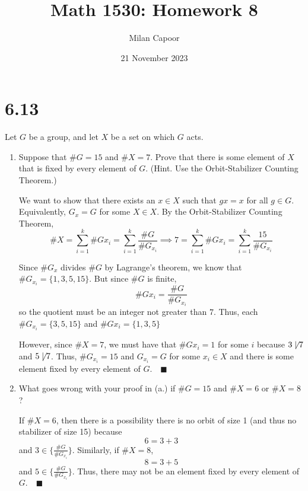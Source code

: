 \documentclass[12pt]{article}
\title{Math 1530: Homework 8}
\author{Milan Capoor}
\date{21 November 2023}
\newcommand{\qed}{\quad \blacksquare}
\begin{document}
\maketitle

\section*{6.13} 
Let $G$ be a group, and let $X$ be a set on which $G$ acts.
\begin{enumerate}
    \item Suppose that $\#G = 15$ and $\#X = 7.$ Prove that there is some element of $X$ that is fixed by every element of $G$. (Hint. Use the Orbit-Stabilizer Counting Theorem.)
    
        \color{blue}
            We want to show that there exists an $x \in X$ such that $gx = x$ for all $g \in G$. Equivalently, $G_x = G$ for some $X \in X$. By the Orbit-Stabilizer Counting Theorem, 
            \[\#X = \sum_{i=1}^k \#Gx_i = \sum_{i=1}^k \frac{\#G}{\# G_{x_i}} \implies 7 = \sum_{i=1}^k \#Gx_i = \sum_{i=1}^k \frac{15}{\#G_{x_i}}\]
            
            Since $\#G_x$ divides $\#G$ by Lagrange's theorem, we know that $\#G_{x_i} = \{1, 3, 5, 15\}$. But since $\#G$ is finite, 
            \[\#Gx_i = \frac{\#G}{\#G_{x_i}}\]
            so the quotient must be an integer not greater than $7$. Thus, each $\#G_{x_i} = \{3, 5, 15\}$ and $\#Gx_i = \{1, 3, 5\}$
            
            However, since $\#X = 7$, we must have that $\#Gx_i = 1$ for some $i$ because $3 \not \mid 7$ and $5 \not \mid 7$. Thus, $\#G_{x_i} = 15$ and $G_{x_i} = G$ for some $x_i \in X$ and there is some element fixed by every element of $G. \qed$
           
        \color{black}

    \item What goes wrong with your proof in (a.) if $\#G = 15$ and $\#X = 6$ or $\#X = 8$?

        \color{blue}
            If $\#X = 6$, then there is a possibility there is no orbit of size 1 (and thus no stabilizer of size 15) because 
            \[6 = 3+3\] 
            and $3 \in \{\frac{\#G}{\#G_{x_i}}\}$. Similarly, if $\#X = 8$, 
            \[8 = 3 + 5\]
            and $5 \in \{\frac{\#G}{\#G_{x_i}}\}.$ Thus, there may not be an element fixed by every element of $G. \qed$
        \color{black}

\end{enumerate}
\end{document}
